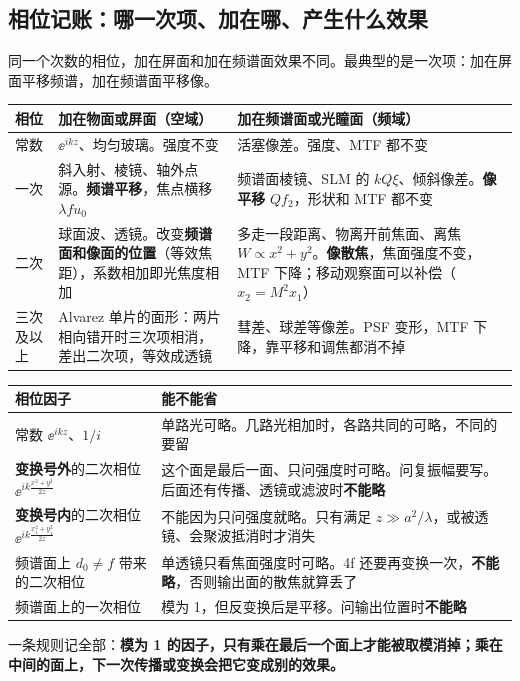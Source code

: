 \subsection*{相位记账：哪一次项、加在哪、产生什么效果}\label{sec:p-ledger}
同一个次数的相位，加在屏面和加在频谱面效果不同。最典型的是一次项：加在屏面平移频谱，加在频谱面平移像。
\begin{center}\small\renewcommand{\arraystretch}{1.45}
\begin{tabular}{@{}P{1.5cm}P{7.3cm}P{7.6cm}@{}}
\toprule
相位 & 加在\textbf{物面或屏面}（空域） & 加在\textbf{频谱面或光瞳面}（频域）\\ \midrule
常数 & $\ee^{ikz}$、均匀玻璃。强度不变 & 活塞像差。强度、MTF 都不变\\
一次 & 斜入射、棱镜、轴外点源。\textbf{频谱平移}，焦点横移 $\lambda fu_0$ & 频谱面棱镜、SLM 的 $kQ\xi$、倾斜像差。\textbf{像平移} $Qf_2$，形状和 MTF 都不变\\
二次 & 球面波、透镜。改变\textbf{频谱面和像面的位置}（等效焦距），系数相加即光焦度相加 & 多走一段距离、物离开前焦面、离焦 $W\propto x^2+y^2$。\textbf{像散焦}，焦面强度不变，MTF 下降；移动观察面可以补偿（$x_2=M^2x_1$）\\
三次及以上 & Alvarez 单片的面形：两片相向错开时三次项相消，差出二次项，等效成透镜 & 彗差、球差等像差。PSF 变形，MTF 下降，靠平移和调焦都消不掉\\
\bottomrule
\end{tabular}
\end{center}

\begin{center}\small\renewcommand{\arraystretch}{1.4}
\begin{tabular}{@{}P{5.2cm}P{11.2cm}@{}}
\toprule
相位因子 & 能不能省\\ \midrule
常数 $\ee^{ikz}$、$1/i$ & 单路光可略。几路光相加时，各路共同的可略，不同的要留\\
\textbf{变换号外}的二次相位 $\ee^{ik\frac{x^2+y^2}{2z}}$ & 这个面是最后一面、只问强度时可略。问复振幅要写。后面还有传播、透镜或滤波时\textbf{不能略}\\
\textbf{变换号内}的二次相位 $\ee^{ik\frac{x_1^2+y_1^2}{2z}}$ & 不能因为只问强度就略。只有满足 $z\gg a^2/\lambda$，或被透镜、会聚波抵消时才消失\\
频谱面上 $d_0\ne f$ 带来的二次相位 & 单透镜只看焦面强度时可略。4f 还要再变换一次，\textbf{不能略}，否则输出面的散焦就算丢了\\
频谱面上的一次相位 & 模为 1，但反变换后是平移。问输出位置时\textbf{不能略}\\
\bottomrule
\end{tabular}
\end{center}
一条规则记全部：\textbf{模为 1 的因子，只有乘在最后一个面上才能被取模消掉；乘在中间的面上，下一次传播或变换会把它变成别的效果。}

